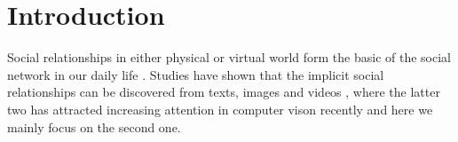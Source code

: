 \documentclass{article}
\begin{document}
\section{Introduction}
Social relationships in either physical or virtual world form the basic of the social network in our daily life \cite{DBLP:conf/wacv/BarrCBF14}. Studies have shown that the implicit social relationships can be discovered from texts, images \cite{DBLP:conf/iccv/LiWZK17,DBLP:conf/ijcai/WangCRYCL18,DBLP:conf/eccv/WangGLF10,DBLP:conf/iccv/ZhangLLT15} and videos \cite{DBLP:conf/eccv/DingY10,DBLP:conf/cvpr/RamanathanY013,DBLP:journals/ivc/VinciarelliPB09}, where the latter two has attracted increasing attention in computer vison recently and here we mainly focus on the second one.
\end{document}
